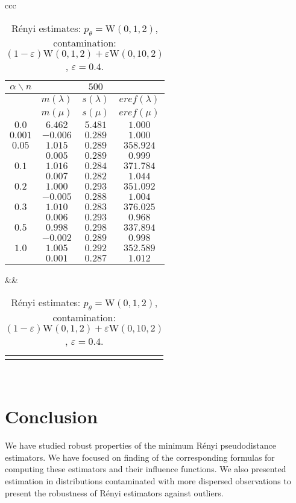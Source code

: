 {\begin{table}[htb] \footnotesize
\begin{center}
\begin{tabular}{ccc}
	\begin{tabular}{|c|ccc|}
	\hline
	$\alpha\backslash n$ &&  $500$ & \\
	\hline
	& $m(\lambda)$ & $s(\lambda)$ & $eref(\lambda)$ \\
	& $m(\mu)$ & $s(\mu)$ & $eref(\mu)$ \\
	\hline
	$0.0$ & $ 6.462 $ & $ 5.481 $ & $ 1.000 $\\
	$0.001$ & $ -0.006 $ & $ 0.289 $ & $ 1.000 $\\
	\hline
	$0.05$ & $ 1.015 $ & $ 0.289 $ & $ 358.924 $\\
	 & $ 0.005 $ & $ 0.289 $ & $ 0.999 $\\
	\hline
	$0.1$ & $ 1.016 $ & $ 0.284 $ & $ 371.784 $\\
	& $ 0.007 $ & $ 0.282 $ & $ 1.044 $\\
	\hline
	$0.2$ & $ 1.000 $ & $ 0.293 $ & $ 351.092 $\\
	& $ -0.005 $ & $ 0.288 $ & $ 1.004 $\\
	\hline
	$0.3$ & $ 1.010 $ & $ 0.283 $ & $ 376.025 $\\
	 & $ 0.006 $ & $ 0.293 $ & $ 0.968 $\\
	\hline
	$0.5$ & $ 0.998 $ & $ 0.298 $ & $ 337.894 $\\
	 & $ -0.002 $ & $ 0.289 $ & $ 0.998 $\\
	\hline
	$1.0$ & $ 1.005 $ & $ 0.292 $ & $ 352.589 $\\
	 & $ 0.001 $ & $ 0.287 $ & $ 1.012 $\\
	\hline
	\end{tabular}
&&
	\begin{tabular}{c}
		\epsfig{file=Weibull-e04-eref.eps, height=2.5in}
	\end{tabular}
\\
\end{tabular}
\end{center}
\caption{R\'{e}nyi estimates: $p_\theta = \mathrm{W}(0,1,2)$, contamination: $(1-\varepsilon)\mathrm{W}(0,1,2) + \varepsilon \mathrm{W}(0,10,2)$, $\varepsilon =  0.4$.}
\label{tabJK:weibull-eref}
\end{table}


\section{Conclusion}
We have studied robust properties of the minimum R\'enyi pseudodistance estimators. We have focused on finding of the corresponding formulas for computing these estimators and their influence functions. We also presented estimation in distributions contaminated with more dispersed observations to present the robustness of R\'enyi estimators against outliers.

}
